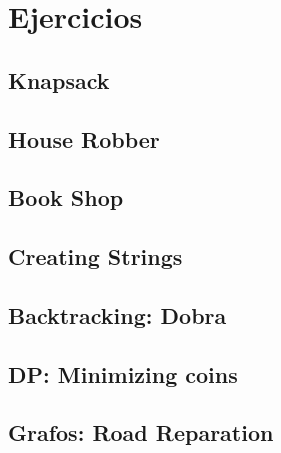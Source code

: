 \section{Ejercicios}

\subsection*{Knapsack}



\subsection*{House Robber}



\subsection*{Book Shop}



\subsection*{Creating Strings}



\subsection*{Backtracking: Dobra}



\subsection*{DP: Minimizing coins}



\subsection*{Grafos: Road Reparation}

